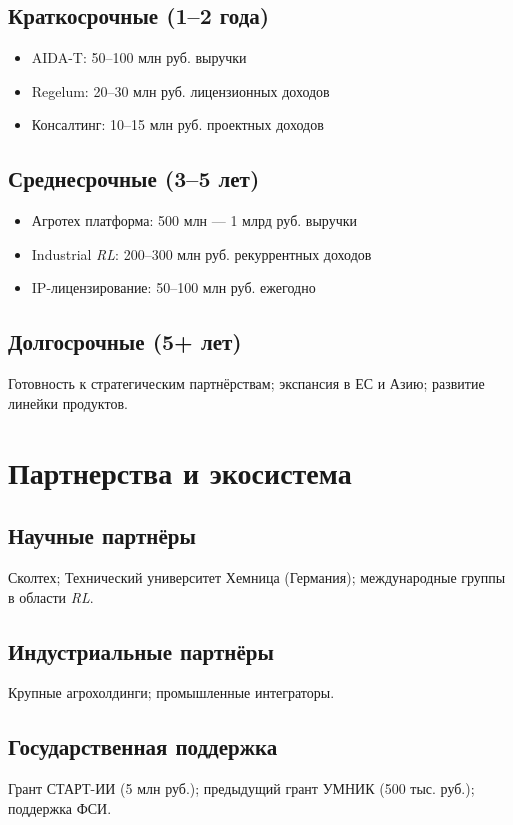 \documentclass[12pt,a4paper]{article}
\begin{document}
\subsection*{Краткосрочные (1–2 года)}
\begin{itemize}
    \item AIDA-T: 50–100 млн руб. выручки
    \item Regelum: 20–30 млн руб. лицензионных доходов
    \item Консалтинг: 10–15 млн руб. проектных доходов
\end{itemize}
\subsection*{Среднесрочные (3–5 лет)}
\begin{itemize}
    \item Агротех платформа: 500 млн --- 1 млрд руб. выручки
    \item Industrial \textit{RL}: 200–300 млн руб. рекуррентных доходов
    \item IP-лицензирование: 50–100 млн руб. ежегодно
\end{itemize}
\subsection*{Долгосрочные (5+ лет)}
Готовность к стратегическим партнёрствам; экспансия в ЕС и Азию; развитие линейки продуктов.

\section{Партнерства и экосистема}
\subsection*{Научные партнёры}
Сколтех; Технический университет Хемница (Германия); международные группы в области \textit{RL}.

\subsection*{Индустриальные партнёры}
Крупные агрохолдинги; промышленные интеграторы.

\subsection*{Государственная поддержка}
Грант СТАРТ-ИИ (5 млн руб.); предыдущий грант УМНИК (500 тыс. руб.); поддержка ФСИ.
\end{document}
